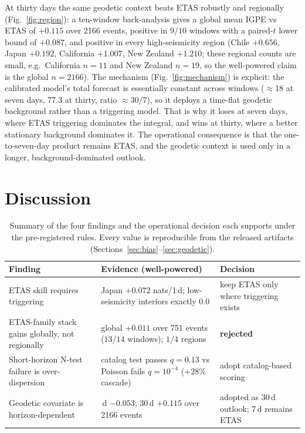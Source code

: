 \documentclass[journal]{IEEEtran}
\begin{document}
At thirty days the same geodetic context beats ETAS robustly and regionally
(Fig.~\ref{fig:region}): a ten-window back-analysis gives a global mean IGPE vs ETAS of
$+0.115$ over 2166 events, positive in $9/10$ windows with a paired-$t$ lower bound of
$+0.087$, and positive in every high-seismicity region (Chile $+0.656$, Japan $+0.192$,
California $+1.007$, New Zealand $+1.210$; these regional counts are small, e.g.\ California
$n\!=\!11$ and New Zealand $n\!=\!19$, so the well-powered claim is the global $n\!=\!2166$).
The mechanism (Fig.~\ref{fig:mechanism}) is
explicit: the calibrated model's total forecast is essentially constant across windows
($\approx$18 at seven days, 77.3 at thirty, ratio $\approx30/7$), so it deploys a time-flat geodetic
background rather than a triggering model. That is why it loses at seven days, where ETAS
triggering dominates the integral, and wins at thirty, where a better stationary background
dominates it. The operational consequence is that the one-to-seven-day product remains ETAS,
and the geodetic context is used only in a longer, background-dominated outlook.

\section{Discussion}

\begin{table}[!t]
\caption{Summary of the four findings and the operational decision each supports under the
pre-registered rules. Every value is reproducible from the released artifacts
(Sections~\ref{sec:bias}--\ref{sec:geodetic}).}
\label{tab:summary}
\centering
\footnotesize
\renewcommand{\arraystretch}{1.25}
\begin{tabular}{@{}>{\raggedright\arraybackslash}p{}>{\raggedright\arraybackslash}p{}>{\raggedright\arraybackslash}p{}@{}}
\toprule
Finding & Evidence (well-powered) & Decision \\
\midrule
ETAS skill requires triggering & Japan $+0.072$ nats/1\,d; low-seismicity interiors exactly $0.0$ & keep ETAS only where triggering exists \\
ETAS-family stack gains globally, not regionally & global $+0.011$ over 751 events ($13/14$ windows); $1/4$ regions & \textbf{rejected} \\
Short-horizon N-test failure is over-dispersion & catalog test passes $q\!=\!0.13$ vs Poisson fails $q\!=\!10^{-4}$ ($+28\%$ cascade) & adopt catalog-based scoring \\
Geodetic covariate is horizon-dependent & 7\,d $-0.053$; 30\,d $+0.115$ over 2166 events & adopted as 30\,d outlook; 7\,d remains ETAS \\
\bottomrule
\end{tabular}
\end{table}
\end{document}
